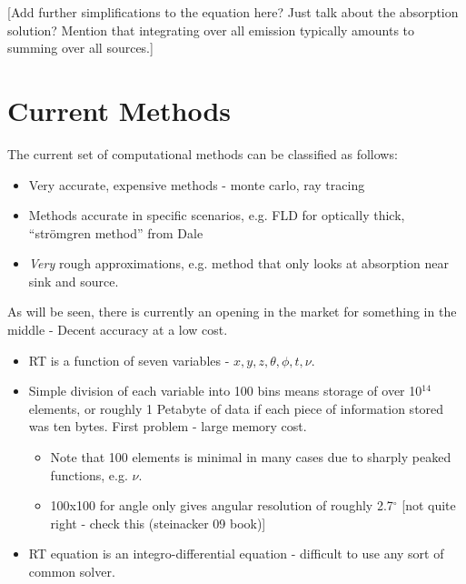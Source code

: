 [Add further simplifications to the equation here? Just talk about the absorption solution? Mention that integrating over all emission typically amounts to summing over all sources.]

%

\section{Current Methods}
\label{sec:currentmethods}

The current set of computational methods can be classified as follows:

\begin{itemize}
\item Very accurate, expensive methods - monte carlo, ray tracing
\item Methods accurate in specific scenarios, e.g. FLD for optically thick, ``str\"omgren method'' from Dale
\item \emph{Very} rough approximations, e.g. method that only looks at absorption near sink and source.
\end{itemize}

As will be seen, there is currently an opening in the market for something in the middle - Decent accuracy at a low cost.


\begin{itemize}
\item RT is a function of seven variables - $x, y, z, \theta, \phi, t, \nu$.
\item Simple division of each variable into 100 bins means storage of over 10$^{14}$ elements, or roughly 1 Petabyte of data if each piece of information stored was ten bytes. First problem - large memory cost.
 \begin{itemize}
 \item Note that 100 elements is minimal in many cases due to sharply peaked functions, e.g. $\nu$.
 \item 100x100 for angle only gives angular resolution of roughly 2.7$^{\circ}$ [not quite right - check this (steinacker 09 book)] 
 \end{itemize}
\item RT equation is an integro-differential equation - difficult to use any sort of common solver.
\end{itemize}

